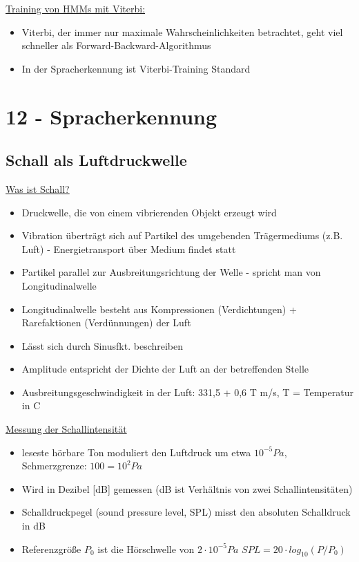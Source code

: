 \documentclass[a4paper,10pt,oneside]{article}
\begin{document}
\underline{Training von HMMs mit Viterbi:} \\ 
	\begin{itemize}
		\item Viterbi, der immer nur maximale Wahrscheinlichkeiten betrachtet, geht viel schneller als Forward-Backward-Algorithmus
		\item In der Spracherkennung ist Viterbi-Training Standard
	\end{itemize}
	
\section{12 - Spracherkennung}
\subsection{Schall als Luftdruckwelle} 

\underline{Was ist Schall?} \\ 
	\begin{itemize}
		\item Druckwelle, die von einem vibrierenden Objekt erzeugt wird
		\item Vibration überträgt sich auf Partikel des umgebenden Trägermediums (z.B. Luft) - Energietransport über Medium findet statt
		\item Partikel parallel zur Ausbreitungsrichtung der Welle - spricht man von Longitudinalwelle
		\item Longitudinalwelle besteht aus Kompressionen (Verdichtungen) + Rarefaktionen (Verdünnungen) der Luft
		\item Lässt sich durch Sinusfkt. beschreiben
		\item Amplitude entspricht der Dichte der Luft an der betreffenden Stelle
		\item Ausbreitungsgeschwindigkeit in der Luft: 331,5 + 0,6 T m/s, T = Temperatur in C
	\end{itemize}

\underline{Messung der Schallintensität} \\  
 	\begin{itemize}
 		\item leseste hörbare Ton moduliert den Luftdruck um etwa $10^{-5} Pa$, Schmerzgrenze: $100 = 10^2 Pa$
 		\item Wird in Dezibel [dB] gemessen (dB ist Verhältnis von zwei Schallintensitäten)
 		\item Schalldruckpegel (sound pressure level, SPL) misst den absoluten Schalldruck in dB
 		\item Referenzgröße $P_0$ ist die Hörschwelle von $2 \cdot 10^{-5} Pa$ $SPL = 20 \cdot log_{10} (P / P_0)$
 	\end{itemize}
 
\end{document}
